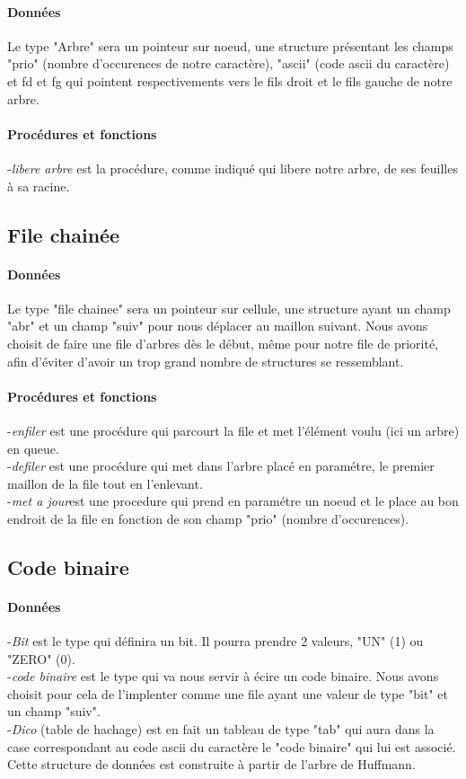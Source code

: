 \documentclass[11pt]{article}
\begin{document}
\paragraph{Données}Le type "Arbre" sera un pointeur sur noeud, une structure présentant les champs "prio" (nombre d'occurences de notre caractère), "ascii" (code ascii du caractère) et fd et fg qui pointent respectivements vers le fils droit et le fils gauche de notre arbre.
\paragraph{Procédures et fonctions}-\emph{libere arbre} est la procédure, comme indiqué qui libere notre arbre, de ses feuilles à sa racine.


\subsection{File chainée}
\paragraph{Données}Le type "file chainee" sera un pointeur sur cellule, une structure ayant un champ "abr" et un champ "suiv" pour nous déplacer au maillon suivant. Nous avons choisit de faire une file d'arbres dès le début, même pour notre file de priorité, afin d'éviter d'avoir un trop grand nombre de structures se ressemblant.
\paragraph{Procédures et fonctions}-\emph{enfiler} est une procédure qui parcourt la file et met l'élément voulu (ici un arbre) en queue.\\-\emph{defiler} est une procédure qui met dans l'arbre placé en paramétre, le premier maillon de la file tout en l'enlevant.\\-\emph{met a jour}est une procedure qui prend en paramétre un noeud et le place au bon endroit de la file en fonction de son champ "prio" (nombre d'occurences).

\subsection{Code binaire}
\paragraph{Données}-\emph{Bit} est le type qui définira un bit. Il pourra prendre 2 valeurs, "UN" (1) ou "ZERO" (0).\\-\emph{code binaire} est le type qui va nous servir à écire un code binaire. Nous avons choisit pour cela de l'implenter comme une file ayant une valeur de type "bit" et un champ "suiv".\\-\emph{Dico} (table de hachage) est en fait un tableau de type "tab" qui aura dans la case correspondant au code ascii du caractère le "code binaire" qui lui est associé. Cette structure de données est construite à partir de l'arbre de Huffmann.
\end{document}
